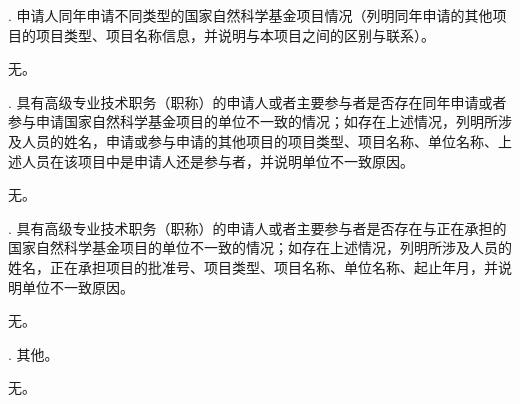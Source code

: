 \documentclass[12pt,UTF8,AutoFakeBold=2,a4paper]{ctexart} %
\newcommand{\sihao}{\fontsize{14pt}{\baselineskip}\selectfont}
\begin{document}
{\sihao \color{MsBlue} . 申请人同年申请不同类型的国家自然科学基金项目情况（列明同年申请的其他项目的项目类型、项目名称信息，并说明与本项目之间的区别与联系）。 }

无。

{\sihao \color{MsBlue} . 具有高级专业技术职务（职称）的申请人或者主要参与者是否存在同年申请或者参与申请国家自然科学基金项目的单位不一致的情况；如存在上述情况，列明所涉及人员的姓名，申请或参与申请的其他项目的项目类型、项目名称、单位名称、上述人员在该项目中是申请人还是参与者，并说明单位不一致原因。}

无。

{\sihao \color{MsBlue} . 具有高级专业技术职务（职称）的申请人或者主要参与者是否存在与正在承担的国家自然科学基金项目的单位不一致的情况；如存在上述情况，列明所涉及人员的姓名，正在承担项目的批准号、项目类型、项目名称、单位名称、起止年月，并说明单位不一致原因。}

无。

{\sihao \color{MsBlue} . 其他。}

无。
\end{document}
